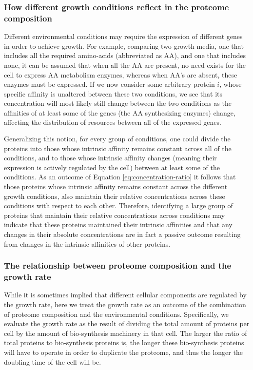 \documentclass[notitlepage]{article}
\begin{document}
\subsubsection{How different growth conditions reflect in the proteome composition}
Different environmental conditions may require the expression of different genes in order to achieve growth.
For example, comparing two growth media, one that includes all the required amino-acids (abbreviated as AA), and one that includes none, it can be assumed that when all the AA are present, no need exists for the cell to express AA metabolism enzymes, whereas when AA's are absent, these enzymes must be expressed.
If we now consider some arbitrary protein $i$, whose specific affinity is unaltered between these two conditions, we see that its concentration will most likely still change between the two conditions as the affinities of at least some of the genes (the AA synthesizing enzymes) change, affecting the distribution of resources between all of the expressed genes.

Generalizing this notion, for every group of conditions, one could divide the proteins into those whose intrinsic affinity remains constant across all of the conditions, and to those whose intrinsic affinity changes (meaning their expression is actively regulated by the cell) between at least some of the conditions.
As an outcome of Equation \ref{eq:concentration-ratio} it follows that those proteins whose intrinsic affinity remains constant across the different growth conditions, also maintain their relative concentrations across these conditions with respect to each other.
Therefore, identifying a large group of proteins that maintain their relative concentrations across conditions may indicate that these proteins maintained their intrinsic affinities and that any changes in their absolute concentrations are in fact a passive outcome resulting from changes in the intrinsic affinities of other proteins.

\subsubsection{The relationship between proteome composition and the growth rate}
While it is sometimes implied that different cellular components are regulated by the growth rate, here we treat the growth rate as an outcome of the combination of proteome composition and the environmental conditions.
Specifically, we evaluate the growth rate as the result of dividing the total amount of proteins per cell by the amount of bio-synthesis machinery in that cell.
The larger the ratio of total proteins to bio-synthesis proteins is, the longer these bio-synthesis proteins will have to operate in order to duplicate the proteome, and thus the longer the doubling time of the cell will be.
\end{document}
